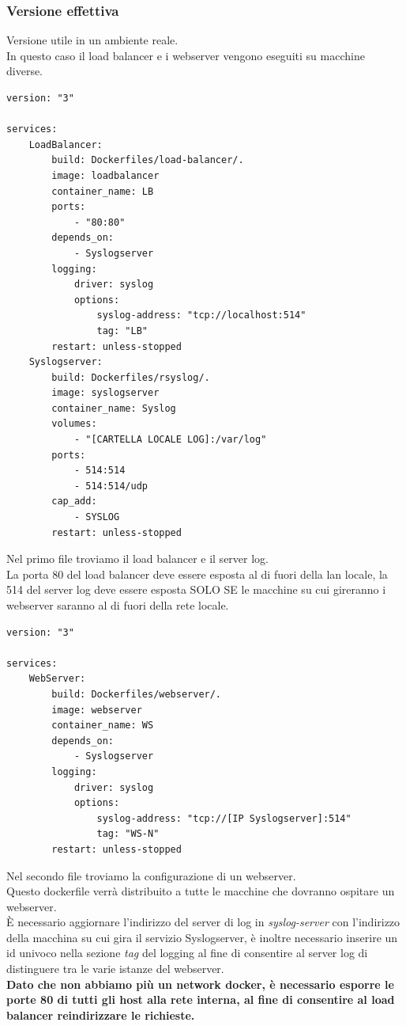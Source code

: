 \documentclass[../DocumentazioneProgetto.tex]{subfiles}
\begin{document}
	\subsubsection{Versione effettiva} 
	Versione utile in un ambiente reale.\\
	In questo caso il load balancer e i webserver vengono eseguiti su macchine diverse.
	\begin{lstlisting}[language=XML, caption=Docker Compose Reale Load Balancer] 
version: "3"

services:
	LoadBalancer:
		build: Dockerfiles/load-balancer/.
		image: loadbalancer
		container_name: LB
		ports:
			- "80:80"
		depends_on:
			- Syslogserver
		logging:
			driver: syslog
			options:
				syslog-address: "tcp://localhost:514"
				tag: "LB"
		restart: unless-stopped
	Syslogserver:
		build: Dockerfiles/rsyslog/.
		image: syslogserver
		container_name: Syslog
		volumes:
			- "[CARTELLA LOCALE LOG]:/var/log"
		ports:
			- 514:514
			- 514:514/udp
		cap_add:
			- SYSLOG
		restart: unless-stopped\end{lstlisting}
		Nel primo file troviamo il load balancer e il server log.\\
		La porta 80 del load balancer deve essere esposta al di fuori della lan locale, la 514 del server log deve essere esposta SOLO SE le macchine su cui gireranno i webserver saranno al di fuori della rete locale.

\begin{lstlisting}[language=XML, caption=Docker Compose Reale Load Balancer] 
version: "3"

services:
	WebServer:
		build: Dockerfiles/webserver/.
		image: webserver
		container_name: WS
		depends_on:
			- Syslogserver
		logging:
			driver: syslog
			options:
				syslog-address: "tcp://[IP Syslogserver]:514"
				tag: "WS-N"
		restart: unless-stopped\end{lstlisting}
	Nel secondo file troviamo la configurazione di un webserver.\\
	Questo dockerfile verrà distribuito a tutte le macchine che dovranno ospitare un webserver.\\
	È necessario aggiornare l'indirizzo del server di log in \textit{syslog-server} con l'indirizzo della macchina su cui gira il servizio Syslogserver, è inoltre necessario inserire un id univoco nella sezione \textit{tag} del logging al fine di consentire al server log di distinguere tra le varie istanze del webserver.\\
	\textbf{Dato che non abbiamo più un network docker, è necessario esporre le porte 80 di tutti gli host alla rete interna, al fine di consentire al load balancer reindirizzare le richieste.} 
\end{document}
